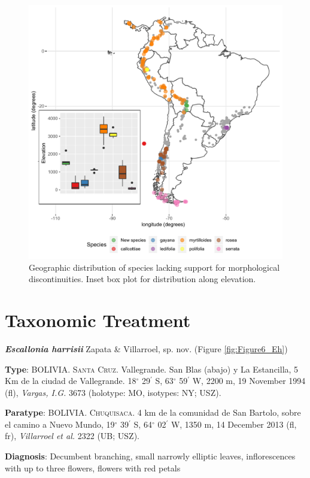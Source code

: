 \documentclass[fleqn,10pt,lineno]{wlpeerj} %
\begin{document}
\begin{figure}[ht]
\centering
\includegraphics[width=\linewidth]{fig5}
\caption{Geographic distribution of species lacking support for morphological discontinuities. Inset box plot for distribution along elevation.}
\label{fig:fig5}
\end{figure}

\section*{Taxonomic Treatment}
\textbf{\emph{Escallonia harrisii}} Zapata \& Villarroel, sp. nov. (Figure \ref{fig:Figure6_Eh})

\textbf{Type}: BOLIVIA. \textsc{Santa Cruz}. Vallegrande. San Blas (abajo) y La Estancilla, 5 Km de la ciudad de Vallegrande. 18$^\circ$ 29$^\prime$ S, 63$^\circ$ 59$^\prime$ W, 2200 m, 19 November 1994 (fl), \textit{Vargas, I.G.} 3673 (holotype: MO, isotypes: NY; USZ).

\textbf{Paratype}: BOLIVIA. \textsc{Chuquisaca}. 4 km de la comunidad de San Bartolo, sobre el camino a Nuevo Mundo, 19$^\circ$ 39$^\prime$ S, 64$^\circ$ 02$^\prime$ W, 1350 m, 14 December 2013 (fl, fr), \textit{Villarroel et al.} 2322 (UB; USZ).

\textbf{Diagnosis}: Decumbent branching, small narrowly elliptic leaves, inflorescences with up to three flowers, flowers with red petals
\end{document}
